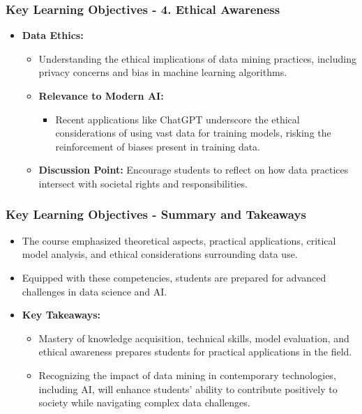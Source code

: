 \documentclass[aspectratio=169]{beamer}
\begin{document}
\begin{frame}[fragile]
    \frametitle{Key Learning Objectives - 4. Ethical Awareness}
    \begin{itemize}
        \item \textbf{Data Ethics:}
        \begin{itemize}
            \item Understanding the ethical implications of data mining practices, including privacy concerns and bias in machine learning algorithms.
            \item \textbf{Relevance to Modern AI:} 
            \begin{itemize}
                \item Recent applications like ChatGPT underscore the ethical considerations of using vast data for training models, risking the reinforcement of biases present in training data.
            \end{itemize}
            \item \textbf{Discussion Point:} 
            Encourage students to reflect on how data practices intersect with societal rights and responsibilities.
        \end{itemize}
    \end{itemize}
\end{frame}

\begin{frame}[fragile]
    \frametitle{Key Learning Objectives - Summary and Takeaways}
    \begin{itemize}
        \item The course emphasized theoretical aspects, practical applications, critical model analysis, and ethical considerations surrounding data use.
        \item Equipped with these competencies, students are prepared for advanced challenges in data science and AI.
        \item \textbf{Key Takeaways:}
        \begin{itemize}
            \item Mastery of knowledge acquisition, technical skills, model evaluation, and ethical awareness prepares students for practical applications in the field.
            \item Recognizing the impact of data mining in contemporary technologies, including AI, will enhance students’ ability to contribute positively to society while navigating complex data challenges.
        \end{itemize}
    \end{itemize}
\end{frame}
\end{document}
